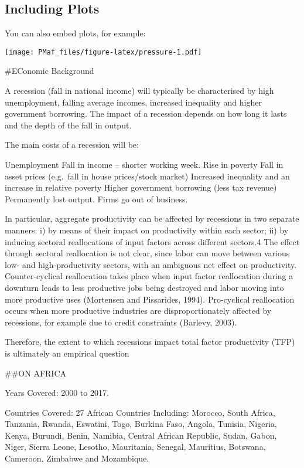 \documentclass[
]{article}
\begin{document}
\hypertarget{including-plots}{%
\subsection{Including Plots}\label{including-plots}}

You can also embed plots, for example:

\texttt{[image: PMaf\_files/figure-latex/pressure-1.pdf]}

\#EConomic Background

A recession (fall in national income) will typically be characterised by
high unemployment, falling average incomes, increased inequality and
higher government borrowing. The impact of a recession depends on how
long it lasts and the depth of the fall in output.

The main costs of a recession will be:

Unemployment Fall in income -- shorter working week. Rise in poverty
Fall in asset prices (e.g.~fall in house prices/stock market) Increased
inequality and an increase in relative poverty Higher government
borrowing (less tax revenue) Permanently lost output. Firms go out of
business.

In particular, aggregate productivity can be affected by recessions in
two separate manners: i) by means of their impact on productivity within
each sector; ii) by inducing sectoral reallocations of input factors
across different sectors.4 The effect through sectoral reallocation is
not clear, since labor can move between various low- and
high-productivity sectors, with an ambiguous net effect on productivity.
Counter-cyclical reallocation takes place when input factor reallocation
during a downturn leads to less productive jobs being destroyed and
labor moving into more productive uses (Mortensen and Pissarides, 1994).
Pro-cyclical reallocation occurs when more productive industries are
disproportionately affected by recessions, for example due to credit
constraints (Barlevy, 2003).

Therefore, the extent to which recessions impact total factor
productivity (TFP) is ultimately an empirical question

\#\#ON AFRICA

Years Covered: 2000 to 2017.

Countries Covered: 27 African Countries Including: Morocco, South
Africa, Tanzania, Rwanda, Eswatini, Togo, Burkina Faso, Angola, Tunisia,
Nigeria, Kenya, Burundi, Benin, Namibia, Central African Republic,
Sudan, Gabon, Niger, Sierra Leone, Lesotho, Mauritania, Senegal,
Mauritius, Botswana, Cameroon, Zimbabwe and Mozambique.
\end{document}
